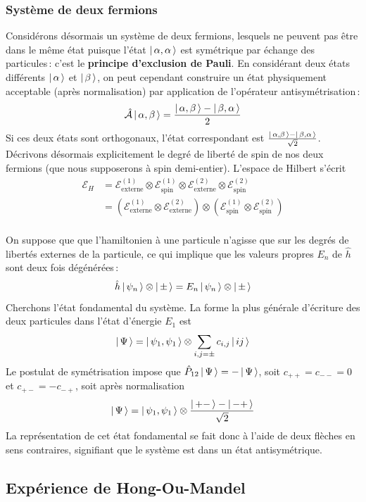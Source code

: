         \subsubsection{Système de deux fermions}

        Considérons désormais un système de deux fermions, lesquels ne peuvent pas être dans le même état puisque l’état $\left| \, \alpha, \alpha \, \right>$ est symétrique par échange des particules : c’est le \textbf{principe d’exclusion de Pauli}. En considérant deux états différents $\left| \, \alpha \, \right>$ et $\left| \, \beta \, \right>$, on peut cependant construire un état physiquement acceptable (après normalisation) par application de l’opérateur antisymétrisation :
        \begin{align*}
            \hat{\mathcal{A}} \left| \, \alpha,\beta \, \right> 
            &= \frac{\left| \, \alpha,\beta \, \right> - \left| \, \beta, \alpha \, \right>}{2} \\
        \end{align*}
        Si ces deux états sont orthogonaux, l’état correspondant est $\frac{\left| \, \alpha,\beta \, \right> - \left| \, \beta, \alpha \, \right>}{\sqrt{2}}$. Décrivons désormais explicitement le degré de liberté de spin de nos deux fermions (que nous supposerons à spin demi-entier). L’espace de Hilbert s’écrit 
        \begin{align*}
            \mathcal{E}_H 
            &= \mathcal{E}_{\text{externe}}^{(1)} \otimes \mathcal{E}_{\text{spin}}^{(1)} \otimes \mathcal{E}_{\text{externe}}^{(2)} \otimes \mathcal{E}_{\text{spin}}^{(2)} \\
            &= \left(\mathcal{E}_{\text{externe}}^{(1)} \otimes \mathcal{E}_{\text{externe}}^{(2)}\right) \otimes \left(\mathcal{E}_{\text{spin}}^{(1)} \otimes \mathcal{E}_{\text{spin}}^{(2)}\right) \\
        \end{align*}

        On suppose que que l’hamiltonien à une particule n’agisse que sur les degrés de libertés externes de la particule, ce qui implique que les valeurs propres $E_n$ de $\hat{h}$ sont deux fois dégénérées :
        \[ \hat{h} \left| \, \psi_n \, \right> \otimes  \left| \, \pm \, \right> = E_n \left| \, \psi_n \, \right> \otimes \left| \, \pm \, \right> \] 
        Cherchons l’état fondamental du système. La forme la plus générale d’écriture des deux particules dans l’état d’énergie $E_1$ est 
        \[ \left| \, \Psi \, \right> = \left| \, \psi_1, \psi_1 \, \right> \otimes \sum_{i,j = \pm} c_{i,j} \left| \, ij \, \right> \]   
        Le postulat de symétrisation impose que $\hat{P}_{12} \left| \, \Psi \, \right> = - \left| \, \Psi \, \right>$, soit $c_{++} = c_{--} = 0$ et $c_{+-} = - c_{-+}$, soit après normalisation
        \[ \left| \, \Psi \, \right> = \left| \, \psi_1, \psi_1 \, \right> \otimes \frac{\left| \, +- \, \right> - \left| \, -+ \, \right>}{\sqrt{2}} \]   
        La représentation de cet état fondamental se fait donc à l’aide de deux flèches en sens contraires, signifiant que le système est dans un état antisymétrique.

    \subsection{Expérience de Hong-Ou-Mandel}



    

       

       
        
        